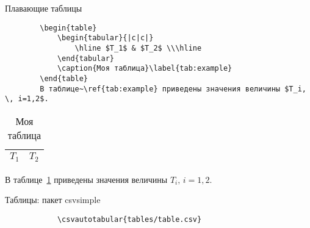 \begin{frame}[fragile]{Плавающие таблицы}
	\small
	\begin{verbatim}
		\begin{table}
			\begin{tabular}{|c|c|}
				\hline $T_1$ & $T_2$ \\\hline
			\end{tabular}
			\caption{Моя таблица}\label{tab:example}
		\end{table}
		В таблице~\ref{tab:example} приведены значения величины $T_i, \, i=1,2$.
	\end{verbatim}
	\begin{table}
		\begin{tabular}{|c|c|}
			\hline$T_1$ & $T_2$ \\\hline
		\end{tabular}
		\caption{Моя таблица}\label{tab:example}
	\end{table}
	В таблице~\ref{tab:example} приведены значения величины $T_i, \, i=1,2$.
\end{frame}

\begin{frame}[fragile]{Таблицы: пакет csvsimple}
	\small

	\begin{minipage}{0.49\textwidth}
		\begin{verbatim}
			\csvautotabular{tables/table.csv}
		\end{verbatim}
	\end{minipage}
	\begin{minipage}{0.49\textwidth}
		\begin{center}
		\end{center}
	\end{minipage}

\end{frame}